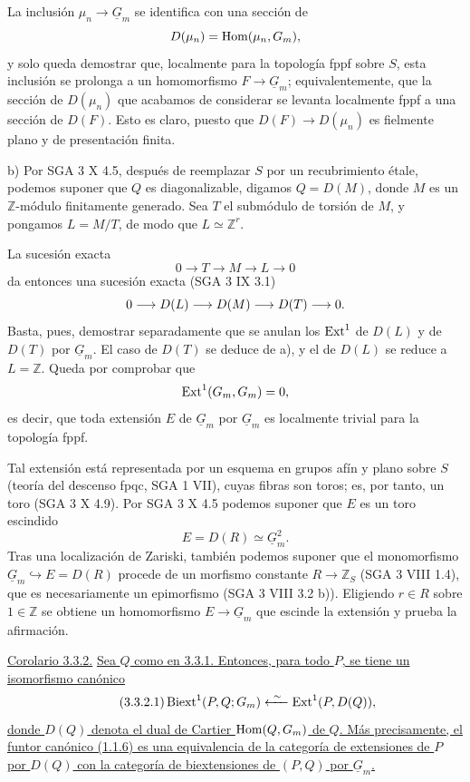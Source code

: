 La inclusión $\mu_n\longrightarrow\underline G_m$ se identifica con
una sección de
\[
 D(\mu_n)=\uHom(\mu_n,\underline G_m),
\]
y solo queda demostrar que, localmente para la topología fppf sobre
$S$, esta inclusión se prolonga a un homomorfismo
$F\longrightarrow\underline G_m$; equivalentemente, que la sección de
$D(\mu_n)$ que acabamos de considerar se levanta localmente fppf a una
sección de $D(F)$. Esto es claro, puesto que
$D(F)\longrightarrow D(\mu_n)$ es fielmente plano y de presentación
finita.

\medskip
\noindent b) Por SGA 3 X 4.5, después de reemplazar $S$ por un
recubrimiento étale, podemos suponer que $Q$ es diagonalizable,
digamos $Q=D(M)$, donde $M$ es un $\mathbb Z$-módulo finitamente
generado. Sea $T$ el submódulo de torsión de $M$, y pongamos $L=M/T$,
de modo que $L\simeq\mathbb Z^r$.


La sucesión exacta
\[
 0\longrightarrow T\longrightarrow M\longrightarrow L
 \longrightarrow0
\]
da entonces una sucesión exacta (SGA 3 IX 3.1)
\[
 0\longrightarrow D(L)\longrightarrow D(M)
 \longrightarrow D(\sisi{L}{T})\longrightarrow0.
\]
Basta, pues, demostrar separadamente que se anulan los $\uExt^1$ de
$D(L)$ y de $D(T)$ por $\underline G_m$. El caso de $D(T)$ se deduce
de a), y el de $D(L)$ se reduce a $L=\mathbb Z$. Queda por comprobar
que
\[
 \uExt^1(\underline G_m,\underline G_m)=0,
\]
es decir, que toda extensión $E$ de $\underline G_m$ por
$\underline G_m$ es localmente trivial para la topología fppf.

Tal extensión está representada por un esquema en grupos afín y plano
sobre $S$ (teoría del descenso fpqc, SGA 1 VII), cuyas fibras son
toros; es, por tanto, un toro (SGA 3 X 4.9). Por SGA 3 X 4.5 podemos
suponer que $E$ es un toro escindido
\[
 E=D(R)\simeq\underline G_m^2.
\]
Tras una localización de Zariski, también podemos suponer que el
monomorfismo $\underline G_m\hookrightarrow E=D(R)$ procede de un
morfismo constante $R\longrightarrow\mathbb Z_S$ (SGA 3 VIII 1.4),
que es necesariamente un epimorfismo (SGA 3 VIII 3.2 b)). Eligiendo
$r\in R$ sobre $1\in\mathbb Z$ se obtiene un homomorfismo
$E\longrightarrow\underline G_m$ que escinde la extensión y prueba la
afirmación.

\medskip
\noindent\underline{Corolario 3.3.2.} \underline{Sea $Q$ como en
3.3.1. Entonces, para todo $P$, se tiene un isomorfismo canónico}
\begin{equation}\tag{3.3.2.1}
 \Biext^1(P,Q;\underline G_m)
 \xleftarrow{\ \sim\ }\Ext^1(P,D(Q)),
\end{equation}
\underline{donde $D(Q)$ denota el dual de Cartier
$\uHom(Q,\underline G_m)$ de $Q$. Más precisamente, el funtor
canónico (1.1.6) es una equivalencia de la categoría de extensiones de
$P$ por $D(Q)$ con la categoría de biextensiones de $(P,Q)$ por
$\underline G_m$.}

